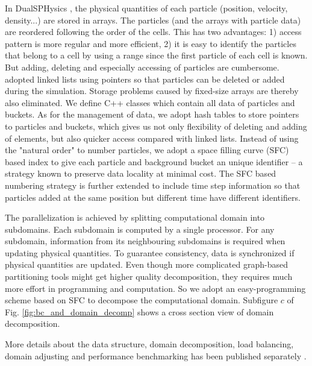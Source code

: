 \documentclass[gmd, manuscript]{copernicus}
\begin{document}
In DualSPHysics \citep {crespo2015dualsphysics}, the physical quantities of each particle (position, velocity, density...) are stored in arrays. The particles (and the arrays with particle data) are reordered following the order of the cells. This has two advantages: 1) access pattern is more regular and more efficient, 2) it is easy to identify the particles that belong to a cell by using a range since the first particle of each cell is known. But adding, deleting and especially accessing of particles are cumbersome. \citet {ferrari2009new} adopted linked lists using pointers so that particles can be deleted or added during the simulation. Storage problems caused by fixed-size arrays are thereby also eliminated. We define C++ classes which contain all data of particles and buckets. As for the management of data, we adopt hash tables to store pointers to particles and buckets, which gives us not only flexibility of deleting and adding of elements, but also quicker access compared with linked lists. Instead of using the "natural order" to number particles, we adopt a space filling curve (SFC) based index to give each particle and background bucket an unique identifier -- a strategy known to preserve data locality at minimal cost. The SFC based numbering strategy is further extended to include time step information so that particles added at the same position but different time have different identifiers. 

The parallelization is achieved by splitting computational domain into subdomains. Each subdomain is computed by a single processor. For any subdomain, information from its neighbouring subdomains is required when updating physical quantities. To guarantee consistency, data is synchronized if physical quantities are updated. Even though more complicated graph-based partitioning tools \citep {biswas1999experiments} might get higher quality decomposition, they requires much more effort in programming and computation. So we adopt an easy-programming scheme based on SFC \citep {patra1999efficient} to decompose the computational domain. Subfigure $c$ of Fig. \ref{fig:bc_and_domain_decomp} shows a cross section view of domain decomposition.

More details about the data structure, domain decomposition, load balancing, domain adjusting and performance benchmarking has been published separately \citep{cao2017data}.
\end{document}
